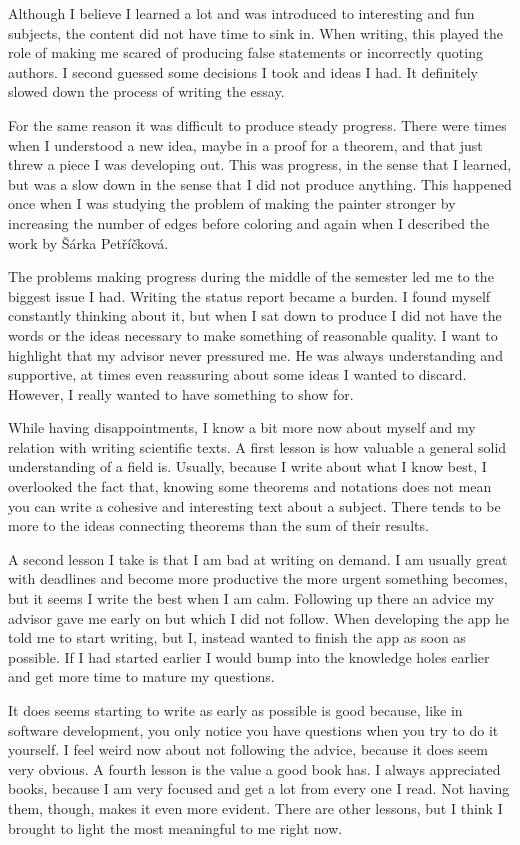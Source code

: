 Although I believe I learned a lot and was introduced to interesting and fun subjects, the content did not have time to sink in. When writing, this played the role of making me scared of producing false statements or incorrectly quoting authors. I second guessed some decisions I took and ideas I had. It definitely slowed down the process of writing the essay.

For the same reason it was difficult to produce steady progress. There were times when I understood a new idea, maybe in a proof for a theorem, and that just threw a piece I was developing out. This was progress, in the sense that I learned, but was a slow down in the sense that I did not produce anything. This happened once when I was studying the problem of making the painter stronger by increasing the number of edges before coloring and again when I described the work by Šárka Petříčková.

The problems making progress during the middle of the semester led me to the biggest issue I had. Writing the status report became a burden. I found myself constantly thinking about it, but when I sat down to produce I did not have the words or the ideas necessary to make something of reasonable quality. I want to highlight that my advisor never pressured me. He was always understanding and supportive, at times even reassuring about some ideas I wanted to discard. However, I really wanted to have something to show for.

While having disappointments, I know a bit more now about myself and my relation with writing scientific texts. A first lesson is how valuable a general solid understanding of a field is. Usually, because I write about what I know best, I overlooked the fact that, knowing some theorems and notations does not mean you can write a cohesive and interesting text about a subject. There tends to be more to the ideas connecting theorems than the sum of their results.

A second lesson I take is that I am bad at writing on demand. I am usually great with deadlines and become more productive the more urgent something becomes, but it seems I write the best when I am calm. Following up there an advice my advisor gave me early on but which I did not follow. When developing the app he told me to start writing, but I, instead wanted to finish the app as soon as possible. If I had started earlier I would bump into the knowledge holes earlier and get more time to mature my questions.

It does seems starting to write as early as possible is good because, like in software development, you only notice you have questions when you try to do it yourself. I feel weird now about not following the advice, because it does seem very obvious. A fourth lesson is the value a good book has. I always appreciated books, because I am very focused and get a lot from every one I read. Not having them, though, makes it even more evident. There are other lessons, but I think I brought to light the most meaningful to me right now.


